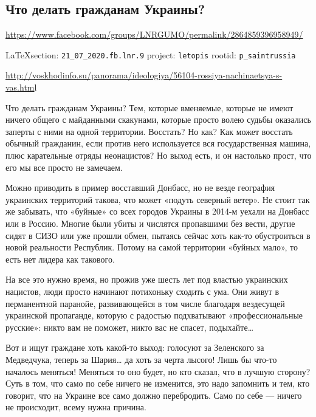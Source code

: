  
 
\subsection{Что делать гражданам Украины?}
\label{sec:21_07_2020.fb.lnr.9}
\url{https://www.facebook.com/groups/LNRGUMO/permalink/2864859396958949/}
  
\vspace{0.5cm}
{\small\LaTeX section: \verb|21_07_2020.fb.lnr.9| project: \verb|letopis| rootid: \verb|p_saintrussia|}
\vspace{0.5cm}

\url{http://voskhodinfo.su/panorama/ideologiya/56104-rossiya-nachinaetsya-s-vas.htm}l

Что делать гражданам Украины? Тем, которые вменяемые, которые не имеют ничего
общего с майданными скакунами, которые просто волею судьбы оказались заперты с
ними на одной территории. Восстать? Но как? Как может восстать обычный
гражданин, если против него используется вся государственная машина, плюс
карательные отряды неонацистов? Но выход есть, и он настолько прост, что его мы
все просто не замечаем.

Можно приводить в пример восставший Донбасс, но не везде география украинских
территорий такова, что может «подуть северный ветер». Не стоит так же забывать,
что «буйные» со всех городов Украины в 2014-м уехали на Донбасс или в Россию.
Многие были убиты и числятся пропавшими без вести, другие сидят в СИЗО или уже
прошли обмен, пытаясь сейчас хоть как-то обустроиться в новой реальности
Республик. Потому на самой территории «буйных мало», то есть нет лидера как
такового.

На все это нужно время, но прожив уже шесть лет под властью украинских
нацистов, люди просто начинают потихоньку сходить с ума. Они живут в
перманентной паранойе, развивающейся в том числе благодаря вездесущей
украинской пропаганде, которую с радостью подхватывают «профессиональные
русские»: никто вам не поможет, никто вас не спасет, подыхайте…

Вот и ищут граждане хоть какой-то выход: голосуют за Зеленского за Медведчука,
теперь за Шария… да хоть за черта лысого! Лишь бы что-то началось меняться!
Меняться то оно будет, но кто сказал, что в лучшую сторону? Суть в том, что
само по себе ничего не изменится, это надо запомнить и тем, кто говорит, что на
Украине все само должно перебродить. Само по себе --- ничего не происходит, всему
нужна причина.

